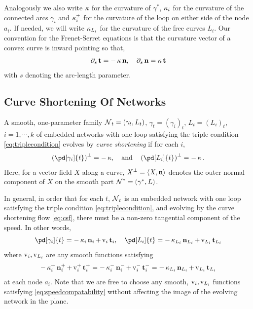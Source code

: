 \documentclass[12pt]{amsart}
\begin{document}
Analogously we also write \(\operatorname{\kappa}\) for the curvature of \(\gamma^{\ast}\), \(\operatorname{\kappa}_i\) for the curvature of the connected arcs \(\gamma_i\) and \(\operatorname{\kappa}^{\pm}_i\) for the curvature of the loop on either side of the node \(a_i\). If needed, we will write \(\operatorname{\kappa}_{L_i}\) for the curvature of the free curves \(L_i\). Our convention for the Frenet-Serret equations is that the curvature vector of a convex curve is inward pointing so that,
\begin{equation}
\label{eq:frenetserret}
\partial_s \operatorname{\mathbf{t}} = -\operatorname{\kappa} \operatorname{\mathbf{n}}, \quad \partial_s \operatorname{\mathbf{n}} = \operatorname{\kappa} \operatorname{\mathbf{t}}
\end{equation}
with \(s\) denoting the arc-length parameter.

\subsection{Curve Shortening Of Networks}
\label{sec:orgheadline3}

\begin{defn}
A smooth, one-parameter family \(\operatorname{\mathcal{N}}_t = (\gamma_t, L_t)\), \(\gamma_t = (\gamma_i)_t\), \(L_t = (L_i)_t\), \(i=1,\cdots,k\) of embedded networks with one loop satisfying the triple condition \eqref{eq:triplecondition} evolves by \emph{curve shortening} if for each \(i\),
\begin{equation}
\label{eq:csf}
\left(\pd[\gamma_i]{t}\right)^{\perp} = -\curvecurv, \quad \text{and} \quad \left(\pd[L_i]{t}\right)^{\perp} = -\curvecurv.
\end{equation}
Here, for a vector field \(X\) along a curve, \(X^{\perp} = \langle{X},{\operatorname{\mathbf{n}}}\rangle\) denotes the outer normal component of \(X\) on the smooth part \(\operatorname{\mathcal{N}}^{\ast} = (\gamma^{\ast}, L)\).
\end{defn}

In general, in order that for each \(t\), \(\operatorname{\mathcal{N}}_t\) is an embedded network with one loop satisfying the triple condition \eqref{eq:triplecondition}, and evolving by the curve shortening flow \eqref{eq:csf}, there must be a non-zero tangential component of the speed. In other words,
\begin{equation}
\label{eq:csf_with_tang}
\pd[\gamma_i]{t} = -\curvecurv_i \nor_i + \tangspeed_i \tang_i, \quad \pd[L_i]{t} = -\curvecurv_{L_i} \nor_{L_i} + \tangspeed_{L_i} \tang_{L_i}
\end{equation}
where \(\operatorname{v}_i, \operatorname{v}_{L_i}\) are any smooth functions satisfying
\begin{equation}
\label{eq:speedcompatability}
-\operatorname{\kappa}_i^+ \operatorname{\mathbf{n}}_i^+ + \operatorname{v}_i^+ \operatorname{\mathbf{t}}_i^+ = -\operatorname{\kappa}_i^- \operatorname{\mathbf{n}}_i^- + \operatorname{v}_i^- \operatorname{\mathbf{t}}_i^- = -\operatorname{\kappa}_{L_i} \operatorname{\mathbf{n}}_{L_i} + \operatorname{v}_{L_i} \operatorname{\mathbf{t}}_{L_i}
\end{equation}
at each node \(a_i\). Note that we are free to choose any smooth, \(\operatorname{v}_i, \operatorname{v}_{L_i}\) functions satisfying \eqref{eq:speedcompatability} without affecting the image of the evolving network in the plane.
\end{document}
